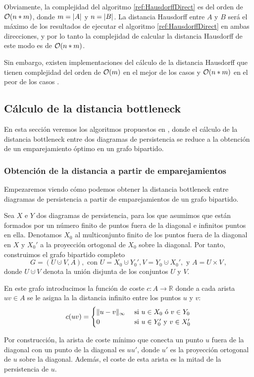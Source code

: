 Obviamente, la complejidad del algoritmo \ref{ref:HausdorffDirect} es del orden de $\mathcal{O}(n*m)$, donde $m = \lvert A\rvert$ y $n = \lvert B\rvert$. La distancia Hausdorff entre $A$ y $B$  será el máximo de los resultados de ejecutar el algoritmo \ref{ref:HausdorffDirect} en ambas direcciones, y por lo tanto la complejidad de calcular la distancia Hausdorff de este modo es de $\mathcal{O}(n*m)$.

Sin embargo, existen implementaciones del cálculo de la distancia Hausdorff que tienen complejidad del orden de $\mathcal{O}(m)$ en el mejor de los casos y $\mathcal{O}(n*m)$ en el peor de los casos \cite{ArticuloHausdorff}.
\subsection{Cálculo de la distancia bottleneck}
En esta sección veremos los algoritmos propuestos en \cite{libroEH}, donde el cálculo de la distancia bottleneck entre dos diagramas de persistencia se reduce a la obtención de un emparejamiento óptimo en un grafo bipartido.

\subsubsection*{Obtención de la distancia a partir de emparejamientos}
Empezaremos viendo cómo podemos obtener la distancia bottleneck entre diagramas de persistencia a partir de emparejamientos de un grafo bipartido.

Sea $X$ e $Y$ dos diagramas de persistencia, para los que asumimos que están formados por un número finito de puntos fuera de la diagonal e infinitos puntos en ella. Denotamos $X_0$ al multiconjunto finito de los puntos fuera de la diagonal en $X$ y $X_0'$ a la proyección ortogonal de $X_0$ sobre la diagonal. Por tanto, construimos el grafo bipartido completo
\[
G= (U \cupdot V, A), \text{ con } U=X_0 \cupdot Y_0', V=Y_0 \cupdot X_0', \text{ y } A=U\times V\,,
\]
donde $U \cupdot V$ denota la unión disjunta de los conjuntos $U$ y $V$.

En este grafo introducimos la función de coste $c: A \to \mathbb{R}$ donde a cada arista $uv \in A$ se le asigna la la distancia infinito entre los puntos $u$ y $v$:
\[
c(uv)=
\begin{cases}
\lVert u-v\rVert_\infty & \text{ si } u \in X_0 \text{ ó } v \in Y_0   \\ 
0 & \text{ si } u \in Y_0' \text{ y } v \in X_0' 
\end{cases}
\]

\begin{remark}
Por construcción, la arista de coste mínimo que conecta un punto $u$ fuera de la diagonal con un punto de la diagonal es $uu'$, donde $u'$ es la proyección ortogonal de $u$ sobre la diagonal. Además, el coste de esta arista es la mitad de la persistencia de $u$. 
\end{remark}


